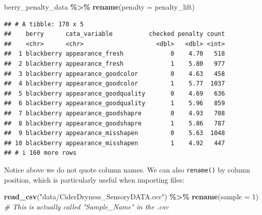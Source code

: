 \documentclass[
]{book}
\newenvironment{Shaded}{\begin{snugshade}}{\end{snugshade}}
\newcommand{\AttributeTok}[1]{\textcolor[rgb]{0.13,0.29,0.53}{#1}}
\newcommand{\CommentTok}[1]{\textcolor[rgb]{0.56,0.35,0.01}{\textit{#1}}}
\newcommand{\DecValTok}[1]{\textcolor[rgb]{0.00,0.00,0.81}{#1}}
\newcommand{\FunctionTok}[1]{\textcolor[rgb]{0.13,0.29,0.53}{\textbf{#1}}}
\newcommand{\NormalTok}[1]{#1}
\newcommand{\SpecialCharTok}[1]{\textcolor[rgb]{0.81,0.36,0.00}{\textbf{#1}}}
\newcommand{\StringTok}[1]{\textcolor[rgb]{0.31,0.60,0.02}{#1}}
\begin{document}
\begin{Shaded}
\begin{Highlighting}[]
\NormalTok{berry\_penalty\_data }\SpecialCharTok{\%\textgreater{}\%}
  \FunctionTok{rename}\NormalTok{(}\AttributeTok{penalty =}\NormalTok{ penalty\_lift)}
\end{Highlighting}
\end{Shaded}

\begin{verbatim}
## # A tibble: 170 x 5
##    berry      cata_variable          checked penalty count
##    <chr>      <chr>                    <dbl>   <dbl> <int>
##  1 blackberry appearance_fresh             0    4.70   518
##  2 blackberry appearance_fresh             1    5.80   977
##  3 blackberry appearance_goodcolor         0    4.63   458
##  4 blackberry appearance_goodcolor         1    5.77  1037
##  5 blackberry appearance_goodquality       0    4.69   636
##  6 blackberry appearance_goodquality       1    5.96   859
##  7 blackberry appearance_goodshapre        0    4.93   708
##  8 blackberry appearance_goodshapre        1    5.86   787
##  9 blackberry appearance_misshapen         0    5.63  1048
## 10 blackberry appearance_misshapen         1    4.92   447
## # i 160 more rows
\end{verbatim}

Notice above we do not quote column names. We can also \texttt{rename()} by column position, which is particularly useful when importing files:

\begin{Shaded}
\begin{Highlighting}[]
\FunctionTok{read\_csv}\NormalTok{(}\StringTok{"data/CiderDryness\_SensoryDATA.csv"}\NormalTok{) }\SpecialCharTok{\%\textgreater{}\%}
  \FunctionTok{rename}\NormalTok{(}\AttributeTok{sample =} \DecValTok{1}\NormalTok{) }\CommentTok{\# This is actually called "Sample\_Name" in the .csv}
\end{Highlighting}
\end{Shaded}
\end{document}
